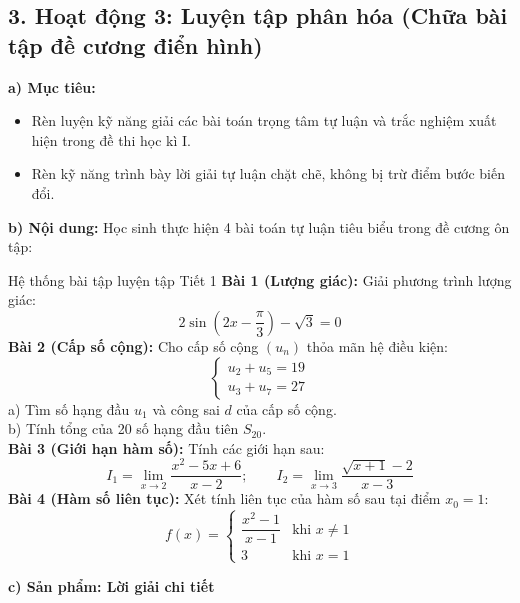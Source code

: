 \documentclass[12pt, a4paper]{article}
\begin{document}
\subsection*{3. Hoạt động 3: Luyện tập phân hóa (Chữa bài tập đề cương điển hình)}

\noindent \textbf{a) Mục tiêu:}
\begin{itemize}
    \item Rèn luyện kỹ năng giải các bài toán trọng tâm tự luận và trắc nghiệm xuất hiện trong đề thi học kì I.
    \item Rèn kỹ năng trình bày lời giải tự luận chặt chẽ, không bị trừ điểm bước biến đổi.
\end{itemize}

\noindent \textbf{b) Nội dung:}
Học sinh thực hiện 4 bài toán tự luận tiêu biểu trong đề cương ôn tập:

\begin{pedabox}{Hệ thống bài tập luyện tập Tiết 1}
    \textbf{Bài 1 (Lượng giác):} Giải phương trình lượng giác:
    $$2\sin\left(2x - \dfrac{\pi}{3}\right) - \sqrt{3} = 0$$
    \textbf{Bài 2 (Cấp số cộng):} Cho cấp số cộng $(u_n)$ thỏa mãn hệ điều kiện:
    $$\begin{cases} u_2 + u_5 = 19 \\ u_3 + u_7 = 27 \end{cases}$$
    a) Tìm số hạng đầu $u_1$ và công sai $d$ của cấp số cộng.\\
    b) Tính tổng của 20 số hạng đầu tiên $S_{20}$.\\
    \textbf{Bài 3 (Giới hạn hàm số):} Tính các giới hạn sau:
    $$I_1 = \lim_{x \to 2} \dfrac{x^2 - 5x + 6}{x - 2}; \qquad I_2 = \lim_{x \to 3} \dfrac{\sqrt{x+1} - 2}{x - 3}$$
    \textbf{Bài 4 (Hàm số liên tục):} Xét tính liên tục của hàm số sau tại điểm $x_0 = 1$:
    $$f(x) = \begin{cases} \dfrac{x^2 - 1}{x - 1} & \text{khi } x \neq 1 \\ 3 & \text{khi } x = 1 \end{cases}$$
\end{pedabox}

\noindent \textbf{c) Sản phẩm: Lời giải chi tiết}
\end{document}
